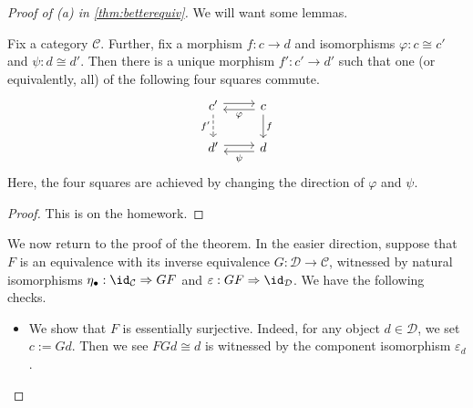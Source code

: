\documentclass[../notes.tex]{subfiles}
\begin{document}
\begin{proof}[Proof of (a) in \autoref{thm:betterequiv}]
	We will want some lemmas.
	\begin{lemma} \label{lem:optimize}
		Fix a category $\mathcal C$. Further, fix a morphism $f:c\to d$ and isomorphisms $\varphi:c\cong c'$ and $\psi:d\cong d'$. Then there is a unique morphism $f':c'\to d'$ such that one (or equivalently, all) of the following four squares commute.
		\[\begin{tikzcd}
			{c'} & c \\
			{d'} & d
			\arrow["{f'}"', dashed, from=1-1, to=2-1]
			\arrow[shift left=1, from=1-1, to=1-2]
			\arrow["\varphi", shift left=1, from=1-2, to=1-1]
			\arrow[shift left=1, from=2-1, to=2-2]
			\arrow["\psi", shift left=1, from=2-2, to=2-1]
			\arrow["f", from=1-2, to=2-2]
		\end{tikzcd}\]
		Here, the four squares are achieved by changing the direction of $\varphi$ and $\psi$.
	\end{lemma}
	\begin{proof}
		This is on the homework.
	\end{proof}
	We now return to the proof of the theorem. In the easier direction, suppose that $F$ is an equivalence with its inverse equivalence $G:\mathcal D\to\mathcal C$, witnessed by natural isomorphisms $\eta_\bullet:\id_\mathcal C\Rightarrow GF$ and $\varepsilon:GF\Rightarrow\id_\mathcal D$. We have the following checks.
	\begin{itemize}
		\item We show that $F$ is essentially surjective. Indeed, for any object $d\in\mathcal D$, we set $c:=Gd$. Then we see $FGd\cong d$ is witnessed by the component isomorphism $\varepsilon_d$.


\end{itemize}
\end{proof}
\end{document}
